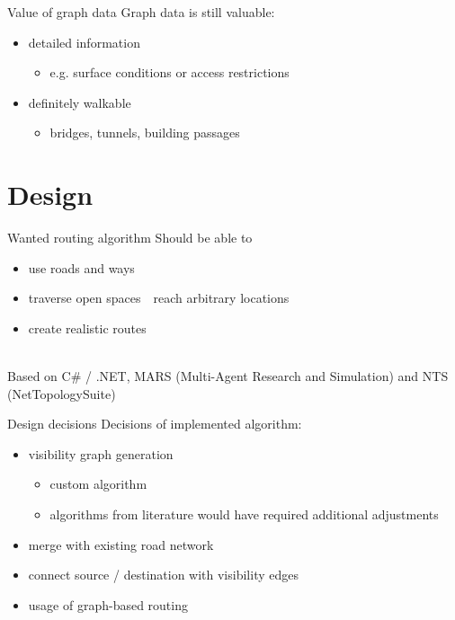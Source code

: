 \documentclass[xcolor={x11names}]{beamer}
\renewcommand{\n}{\hfill\\[0.5ex]}
\newcommand{\nn}{\hfill\\[2ex]}
\begin{document}
		\begin{frame}{Value of graph data}
			Graph data is still valuable:\n
			\begin{itemize}
				\item detailed information
				\begin{itemize}
					\item e.g. surface conditions or access restrictions
				\end{itemize}
				\item definitely walkable
				\begin{itemize}
					\item bridges, tunnels, building passages
				\end{itemize}
			\end{itemize}
		\end{frame}
	
	\section{Design}
	
		\begin{frame}{Wanted routing algorithm}
			Should be able to\n
			\begin{itemize}
				\item use roads and ways
				\item traverse open spaces\ \textrightarrow\ reach arbitrary locations
				\item create realistic routes
			\end{itemize}
			\nn
			\pause
			Based on C\# / .NET, MARS (Multi-Agent Research and Simulation) and NTS (NetTopologySuite)
		\end{frame}
		
		\begin{frame}{Design decisions}
			Decisions of implemented algorithm:\n
			\begin{itemize}
				\item visibility graph generation
				\begin{itemize}
					\item custom algorithm
					\item algorithms from literature would have required additional adjustments
				\end{itemize}
				\item merge with existing road network
				\item connect source / destination with visibility edges
				\item usage of graph-based routing
			\end{itemize}
		\end{frame}
		
\end{document}
